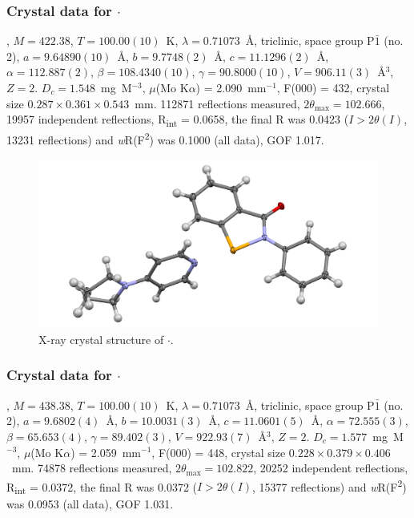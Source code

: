 \begin{refsection}
\subsubsection{Crystal data for \texorpdfstring{$\cdot$}{C22 H21 N3 O Se}}
, $M=422.38$, $T=100.00(10)$~K, $\lambda=0.71073$~\AA, triclinic, space group P$\bar{1}$ (no. 2), $a = 9.64890(10)$~\AA, $b = 9.7748(2)$~\AA, $c = 11.1296(2)$~\AA, $\alpha = 112.887(2)$\degree, $\beta = 108.4340(10)$\degree, $\gamma = 90.8000(10)$\degree, $V = 906.11(3)$~\AA$^{3}$, $Z = 2$. $D_{c}= 1.548$~mg~M$^{-3}$, $\mu$(Mo K$\alpha$) = 2.090~mm$^{-1}$, F(000) = 432, crystal size $0.287 \times 0.361 \times 0.543$~mm. 112871 reflections measured, $2\theta_{\mathrm{max}}=102.666$\degree, 19957 independent reflections, R\textsubscript{int} = 0.0658, the final R was 0.0423 ($I > 2\theta(I)$, 13231 reflections) and \emph{w}R(F\textsuperscript{2}) was 0.1000 (all data), GOF 1.017.

\begin{figure}
  \includegraphics[width=0.6\linewidth]{Figures/ebs-pyrrol-xtal.pdf}
  \caption{X-ray crystal structure of \texorpdfstring{$\cdot$}{C22 H21 N3 O Se}.}
\end{figure}

\subsubsection{Crystal data for \texorpdfstring{$\cdot$}{C22 H21 N3 O2 Se}}
, $M=438.38$, $T=100.00(10)$~K, $\lambda=0.71073$~\AA, triclinic, space group P$\bar{1}$ (no. 2), $a = 9.6802(4)$~\AA, $b = 10.0031(3)$~\AA, $c = 11.0601(5)$~\AA, $\alpha = 72.555(3)$\degree, $\beta = 65.653(4)$\degree, $\gamma = 89.402(3)$\degree, $V = 922.93(7)$~\AA$^{3}$, $Z = 2$. $D_{c}= 1.577$~mg~M$^{-3}$, $\mu$(Mo K$\alpha$) = 2.059~mm$^{-1}$, F(000) = 448, crystal size $0.228 \times 0.379 \times 0.406$~mm. 74878 reflections measured, $2\theta_{\mathrm{max}}=102.822$\degree, 20252 independent reflections, R\textsubscript{int} = 0.0372, the final R was 0.0372 ($I > 2\theta(I)$, 15377 reflections) and \emph{w}R(F\textsuperscript{2}) was 0.0953 (all data), GOF 1.031.


\end{refsection}
